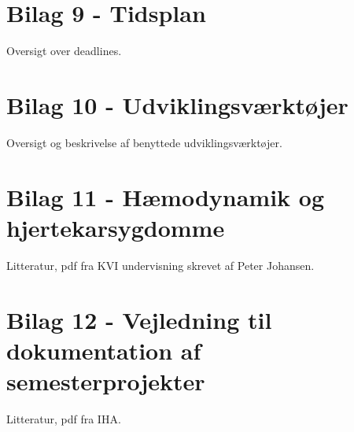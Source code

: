 \section{Bilag 9 - Tidsplan}
Oversigt over deadlines.

\section{Bilag 10 - Udviklingsværktøjer}
Oversigt og beskrivelse af benyttede udviklingsværktøjer.

\section{Bilag 11 - Hæmodynamik og hjertekarsygdomme}
Litteratur, pdf fra KVI undervisning skrevet af Peter Johansen.

\section{Bilag 12 - Vejledning til dokumentation af semesterprojekter}
Litteratur, pdf fra IHA.

